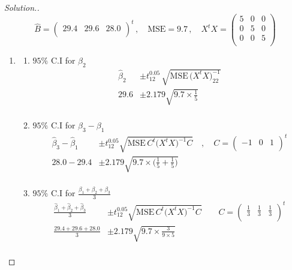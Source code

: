 \documentclass[11pt,a4paper]{article}
\theoremstyle{definition}
\newenvironment{solution}
  {\renewcommand{\qedsymbol}{}\begin{proof}[\textit{Solution}.]}
  {\end{proof}}
\begin{document}
\begin{solution}

$$\widehat{B}=
\begin{pmatrix}
29.4 & 29.6 & 28.0\\
\end{pmatrix}^t
\,, \quad  \text{MSE} = 9.7\, ,\quad  X^tX=
\begin{pmatrix}
5 & 0 & 0\\
0 & 5 & 0\\
0 & 0 & 5\\
\end{pmatrix}
$$

\begin{enumerate}
\item
\begin{enumerate}
    \item $95\%$ C.I for $\beta_2$
\begin{align*}
\widehat{\beta}_2 & \pm t^{0.05}_{12}\,\sqrt{\text{MSE}\,\big(X^tX\big)^{-1}_{22}}\\
29.6 & \pm 2.179\sqrt{9.7\times \frac{1}{5}}\\
\end{align*}

     \item $95\%$ C.I for $\beta_3-\beta_1$
\begin{align*}
\widehat{\beta}_3-\widehat{\beta}_1 & \pm t^{0.05}_{12}\sqrt{\text{MSE}\,C^t\big(X^tX\big)^{-1}C}\quad ,\quad  C=
\begin{pmatrix}
-1 & 0 & 1\\
\end{pmatrix}^t\\
28.0-29.4 & \pm 2.179\sqrt{9.7\times \big(\frac{1}{5}+\frac{1}{5}\big)}\\
\end{align*}

       \item $95\%$ C.I for $\frac{\beta_1+\beta_2+\beta_3}{3}$
\begin{align*}
\frac{\widehat{\beta}_1+\widehat{\beta}_2+\widehat{\beta}_3}{3} & \pm t^{0.05}_{12}\sqrt{\text{MSE}\, C^t\big(X^tX\big)^{-1}C}\qquad  C=
\begin{pmatrix}
\frac{1}{3} & \frac{1}{3}&\frac{1}{3}\\
\end{pmatrix}^t\\
\frac{29.4+29.6+28.0}{3} & \pm 2.179\sqrt{9.7\times \frac{3}{9\times 5}}\\
\end{align*} 
\end{enumerate}


\end{enumerate}
\end{solution}
\end{document}
